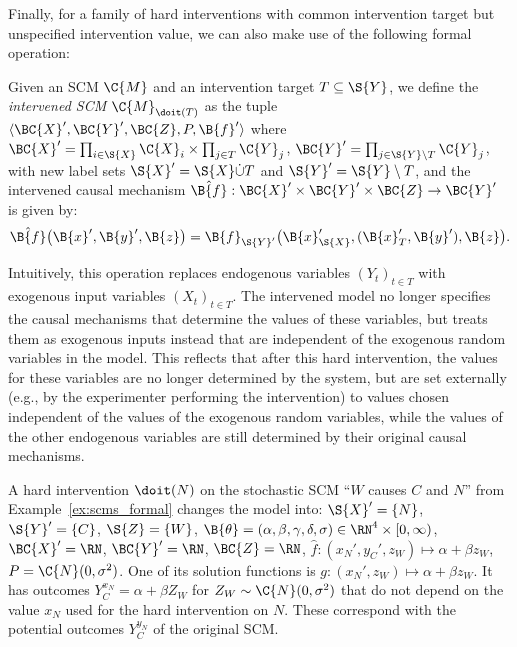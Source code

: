 Finally, for a family of hard interventions with common intervention
target but unspecified intervention value, we can also make use of the following
formal operation:
\begin{Def}\label{def:intervened_scm}
  Given an SCM $\C{M}$ and an intervention target $T \subseteq \S{Y}$, we define the \emph{intervened SCM
  $\C{M}_{\doit(T)}$} as the tuple $\langle \BC{X}',\BC{Y}',\BC{Z},P,\B{f}' \rangle$ where
  $\BC{X}' = \prod_{i\in\S{X}} \C{X}_i \times \prod_{j\in T} \C{Y}_j$,
  $\BC{Y}' = \prod_{j\in\S{Y}\setminus T} \C{Y}_j$,
  with new label sets $\S{X}' = \S{X} \dot\cup T$ and $\S{Y}' = \S{Y} \setminus T$, and the
  intervened causal mechanism $\hat{\B{f}} : \BC{X}' \times \BC{Y}' \times \BC{Z} \to \BC{Y}'$ is given by:
  $$\hat{\B{f}}\big(\B{x}',\B{y}',\B{z}\big) = \B{f}_{\S{Y}'}\big(\B{x}'_{\S{X}},(\B{x}'_{T},\B{y}'),\B{z}\big).$$
\end{Def}
Intuitively, this operation replaces endogenous variables $(Y_t)_{t\in T}$ with exogenous input variables $(X_t)_{t\in T}$.
The intervened model no longer specifies the causal mechanisms that determine the values of these variables, 
but treats them as exogenous inputs instead that are independent of the exogenous random variables in the model. 
This reflects that after this hard intervention, the values for
these variables are no longer determined by the system, but are set externally (e.g., by the 
experimenter performing the intervention) to values chosen independent of the values of the exogenous
random variables, while the values of the other endogenous variables are still
determined by their original causal mechanisms.
\begin{Eg}
  A hard intervention $\doit(N)$ on the stochastic SCM ``$W$ causes $C$ and $N$'' from Example~\ref{ex:scms_formal} 
  changes the model into:
  $\S{X}' = \{N\}$, $\S{Y}' = \{C\}$, $\S{Z} = \{W\}$, $\B{\theta} = (\alpha,\beta,\gamma,\delta,\sigma) \in \RN^4 \times [0,\infty)$, 
  $\BC{X}' = \RN$, $\BC{Y}' = \RN$, $\BC{Z} = \RN$, $\hat{f} : (x_N', y_C', z_W) \mapsto \alpha + \beta z_W$, $P = \C{N}(0,\sigma^2)$.
  One of its solution functions is $g : (x_N', z_W) \mapsto \alpha + \beta z_W$. 
  It has outcomes $Y_C^{x_N} = \alpha + \beta Z_W$ for
  $Z_W \sim \C{N}(0,\sigma^2)$ that do not depend on the value $x_N$ used for the hard intervention on $N$.
  These correspond with the potential outcomes $Y_C^{y_N}$ of the original SCM.
\end{Eg}

